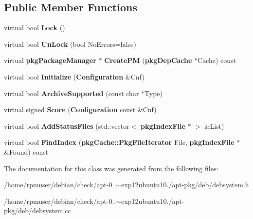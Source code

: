 \subsection*{\-Public \-Member \-Functions}
\begin{DoxyCompactItemize}
\item 
virtual bool {\bfseries \-Lock} ()\label{classdebSystem_a747fd95916e116a6ed37cc641e394c69}

\item 
virtual bool {\bfseries \-Un\-Lock} (bool \-No\-Errors=false)\label{classdebSystem_ab45e970c8ea44bbb120af41fc5e2a43f}

\item 
virtual {\bf pkg\-Package\-Manager} $\ast$ {\bfseries \-Create\-P\-M} ({\bf pkg\-Dep\-Cache} $\ast$\-Cache) const \label{classdebSystem_a9b88e90152156861fc5210e5598d69aa}

\item 
virtual bool {\bfseries \-Initialize} ({\bf \-Configuration} \&\-Cnf)\label{classdebSystem_a295ecf204cefa8729680c2cfdfe7051a}

\item 
virtual bool {\bfseries \-Archive\-Supported} (const char $\ast$\-Type)\label{classdebSystem_a4acb4ef24def19ad4b45c1f10d49f185}

\item 
virtual signed {\bfseries \-Score} ({\bf \-Configuration} const \&\-Cnf)\label{classdebSystem_ad46f817fa35d0bb611e490eb63d44c3d}

\item 
virtual bool {\bfseries \-Add\-Status\-Files} (std\-::vector$<$ {\bf pkg\-Index\-File} $\ast$ $>$ \&\-List)\label{classdebSystem_a87cb2c8845646cd04fb231da6f1721f7}

\item 
virtual bool {\bfseries \-Find\-Index} ({\bf pkg\-Cache\-::\-Pkg\-File\-Iterator} \-File, {\bf pkg\-Index\-File} $\ast$\&\-Found) const \label{classdebSystem_a5a001ca1f36543c5906681574a0b654d}

\end{DoxyCompactItemize}


\-The documentation for this class was generated from the following files\-:\begin{DoxyCompactItemize}
\item 
/home/rpmuser/debian/check/apt-\/0..$\sim$exp12ubuntu10./apt-\/pkg/deb/debsystem.\-h\item 
/home/rpmuser/debian/check/apt-\/0..$\sim$exp12ubuntu10./apt-\/pkg/deb/debsystem.\-cc\end{DoxyCompactItemize}
